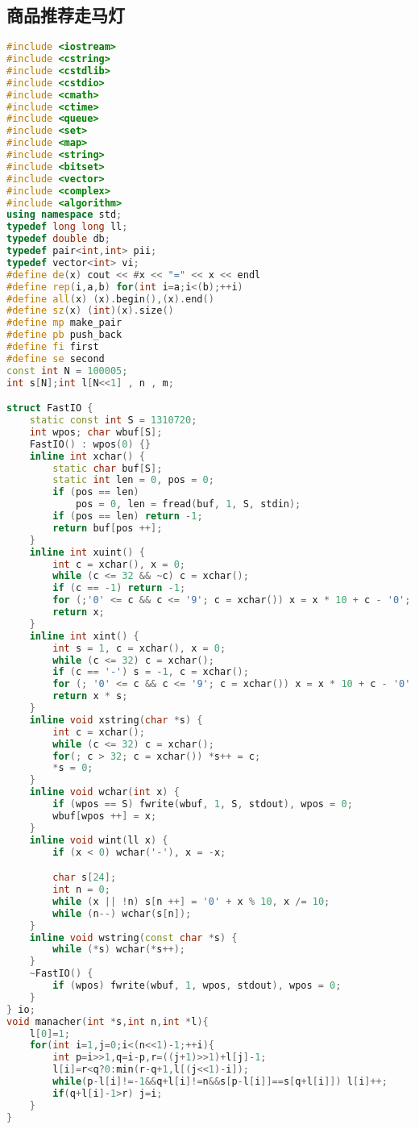\subsection{商品推荐走马灯}
\begin{lstlisting}[language=C++]
#include <iostream>
#include <cstring>
#include <cstdlib>
#include <cstdio>
#include <cmath>
#include <ctime>
#include <queue>
#include <set>
#include <map>
#include <string>
#include <bitset>
#include <vector>
#include <complex>
#include <algorithm>
using namespace std;
typedef long long ll;
typedef double db;
typedef pair<int,int> pii;
typedef vector<int> vi;
#define de(x) cout << #x << "=" << x << endl
#define rep(i,a,b) for(int i=a;i<(b);++i)
#define all(x) (x).begin(),(x).end()
#define sz(x) (int)(x).size()
#define mp make_pair
#define pb push_back
#define fi first
#define se second
const int N = 100005;
int s[N];int l[N<<1] , n , m;

struct FastIO {
    static const int S = 1310720;
    int wpos; char wbuf[S];
    FastIO() : wpos(0) {}
    inline int xchar() {
        static char buf[S];
        static int len = 0, pos = 0;
        if (pos == len)
            pos = 0, len = fread(buf, 1, S, stdin);
        if (pos == len) return -1;
        return buf[pos ++];
    }
    inline int xuint() {
        int c = xchar(), x = 0;
        while (c <= 32 && ~c) c = xchar();
        if (c == -1) return -1;
        for (;'0' <= c && c <= '9'; c = xchar()) x = x * 10 + c - '0';
        return x;
    }
    inline int xint() {
        int s = 1, c = xchar(), x = 0;
        while (c <= 32) c = xchar();
        if (c == '-') s = -1, c = xchar();
        for (; '0' <= c && c <= '9'; c = xchar()) x = x * 10 + c - '0';
        return x * s;
    }
    inline void xstring(char *s) {
        int c = xchar();
        while (c <= 32) c = xchar();
        for(; c > 32; c = xchar()) *s++ = c;
        *s = 0;
    }
    inline void wchar(int x) {
        if (wpos == S) fwrite(wbuf, 1, S, stdout), wpos = 0;
        wbuf[wpos ++] = x;
    }
    inline void wint(ll x) {
        if (x < 0) wchar('-'), x = -x;

        char s[24];
        int n = 0;
        while (x || !n) s[n ++] = '0' + x % 10, x /= 10;
        while (n--) wchar(s[n]);
    }
    inline void wstring(const char *s) {
        while (*s) wchar(*s++);
    }
    ~FastIO() {
        if (wpos) fwrite(wbuf, 1, wpos, stdout), wpos = 0;
    }
} io;
void manacher(int *s,int n,int *l){
    l[0]=1;
    for(int i=1,j=0;i<(n<<1)-1;++i){
        int p=i>>1,q=i-p,r=((j+1)>>1)+l[j]-1;
        l[i]=r<q?0:min(r-q+1,l[(j<<1)-i]);
        while(p-l[i]!=-1&&q+l[i]!=n&&s[p-l[i]]==s[q+l[i]]) l[i]++;
        if(q+l[i]-1>r) j=i;
    }
}


\end{lstlisting}
